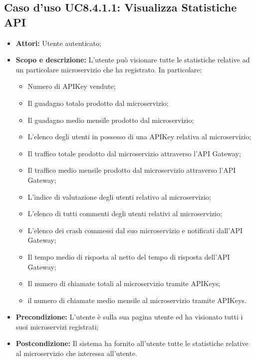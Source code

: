 \documentclass[12pt,a4paper,titlepage]{article}
\begin{document}
\subsection{Caso d'uso UC8.4.1.1: Visualizza Statistiche API}
\begin{itemize}
	\item \textbf{Attori: }Utente autenticato;
	\item \textbf{Scopo e descrizione: }L'utente può visionare tutte le statistiche relative ad un particolare microservizio che ha registrato. In particolare:
	\begin{itemize}
		\item Numero di APIKey vendute;
		\item Il guadagno totalo prodotto dal microservizio;
		\item Il guadagno medio mensile prodotto dal microservizio;
		\item L'elenco degli utenti in possesso di una APIKey relativa al microservizio;
		\item Il traffico totale prodotto dal microservizio attraverso l'API Gateway;
		\item Il traffico medio mensile prodotto dal microservizio attraverso l'API Gateway;
		\item L'indice di valutazione degli utenti relativo al microservizio;
		\item L'elenco di tutti commenti degli utenti relativi al microservizio;
		\item L'elenco dei crash commessi dal suo microservizio e notificati dall'API Gateway;
		\item Il tempo medio di risposta al netto del tempo di risposta dell'API Gateway;
		\item Il numero di chiamate totali al microservizio tramite APIKeys;
		\item il numero di chiamate medio mensile al microservizio tramite APIKeys.
	\end{itemize}
	\item \textbf{Precondizione: }L'utente è sulla sua pagina utente ed ha visionato tutti i suoi microservizi registrati;
	\item \textbf{Postcondizione: }Il sistema ha fornito all'utente tutte le statistiche relative al microservizio che interessa all'utente.
\end{itemize}
\end{document}
